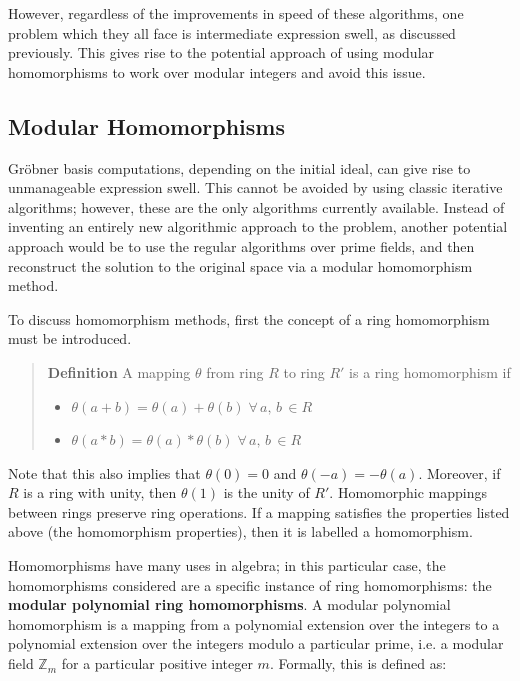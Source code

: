 \documentclass[letterpaper,12pt,titlepage,oneside,final]{book}
\newenvironment{defn}{\begin{quote}%
  \textbf{Definition }%
  \quad
}{%
\end{quote}%
}
\begin{document}
However, regardless of the improvements in speed of these algorithms, one problem which they all face is intermediate expression swell, as discussed previously.  This gives rise to the potential approach of using modular homomorphisms to work over modular integers and avoid this issue.      
 
\subsection{Modular Homomorphisms}

Gr\"obner basis computations, depending on the initial ideal, can give rise to unmanageable expression swell.  This cannot be avoided by using classic iterative algorithms; however, these are the only algorithms currently available.  Instead of inventing an entirely new algorithmic approach to the problem, another potential approach would be to use the regular algorithms over prime fields, and then reconstruct the solution to the original space via a modular homomorphism method.

To discuss homomorphism methods, first the concept of a ring homomorphism must be introduced.

\begin{defn}\label{Homom}
  A mapping $\theta$ from ring ${R}$ to ring ${R'}$ is a ring homomorphism if
  \begin{itemize}
    \item ${\theta(a + b) = \theta(a) + \theta(b) \; \forall \, a, \, b \, \in R}$ 
    \item ${\theta(a * b) = \theta(a) * \theta(b) \; \forall \, a, \, b \, \in R}$ 
  \end{itemize} 
\end{defn}
Note that this also implies that ${\theta(0) = 0}$ and ${\theta(-a) = -\theta(a)}$.  Moreover, if ${R}$ is a ring with unity, then ${\theta(1)}$ is the unity of ${R'}$.  Homomorphic mappings between rings preserve ring operations.  If a mapping satisfies the properties listed above (the homomorphism properties), then it is labelled a homomorphism.

Homomorphisms have many uses in algebra; in this particular case, the homomorphisms considered are a specific instance of ring homomorphisms: the \textbf{modular polynomial ring homomorphisms}.  A modular polynomial homomorphism is a mapping from a polynomial extension over the integers to a polynomial extension over the integers modulo a particular prime, i.e. a modular field ${\mathbb{Z}_m}$ for a particular positive integer ${m}$.  Formally, this is defined as:
\end{document}
